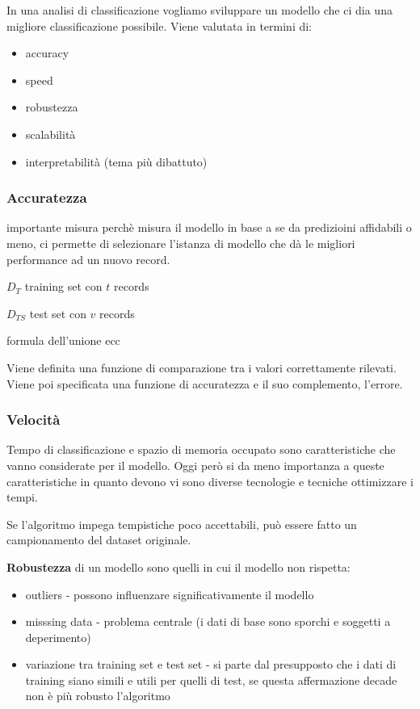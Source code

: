 In una analisi di classificazione vogliamo sviluppare un modello che ci dia una migliore classificazione possibile. Viene valutata in termini di:
\begin{itemize}
	\item accuracy
	\item speed
	\item robustezza
	\item scalabilit\`a
	\item interpretabilit\`a (tema pi\`u dibattuto)
\end{itemize}

\subsubsection{Accuratezza}
importante misura perch\`e misura il modello in base a se da predizioini affidabili o meno, ci permette di selezionare l'istanza di modello che d\`a le migliori performance ad un nuovo record.

$D_T$ training set con $t$ records

$D_{TS}$ test set con $v$ records

formula dell'unione ecc

Viene definita una funzione di comparazione tra i valori correttamente rilevati. Viene poi specificata una funzione di accuratezza e il suo complemento, l'errore.

\subsubsection{Velocit\`a}
Tempo di classificazione e spazio di memoria occupato sono caratteristiche che vanno considerate per il modello. Oggi per\`o si da meno importanza a queste caratteristiche in quanto devono vi sono diverse tecnologie e tecniche ottimizzare i tempi.

Se l'algoritmo impega tempistiche poco accettabili, pu\`o essere fatto un campionamento del dataset originale. 

\textbf{Robustezza} di un modello sono quelli in cui il modello non rispetta:
\begin{itemize}
	\item outliers - possono influenzare significativamente il modello
	\item misssing data - problema centrale (i dati di base sono sporchi e soggetti a deperimento)
	\item variazione tra training set e test set - si parte dal presupposto che i dati di training siano simili e utili per quelli di test, se questa affermazione decade non \`e pi\`u robusto l'algoritmo
\end{itemize}

